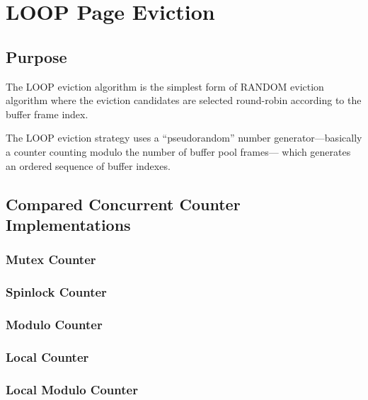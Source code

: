 \chapter[LOOP Page Eviction]{LOOP Page Eviction} \label{ch:loop}

\section[Purpose]{Purpose}

	The LOOP eviction algorithm is the simplest form of RANDOM eviction algorithm where the eviction candidates are selected round-robin according to the buffer frame index.
	
	The LOOP eviction strategy uses a ``pseudorandom'' number generator---basically a counter counting modulo the number of buffer pool frames--- which generates an ordered sequence of buffer indexes.

\section[Compared Concurrent Counter Implementations]{Compared Concurrent Counter Implementations}

\subsection[Mutex Counter]{Mutex Counter} \label{subsec:mutex_counter}

\subsection[Spinlock Counter]{Spinlock Counter} \label{subsec:spinlock_counter}

\subsection[Modulo Counter]{Modulo Counter} \label{subsec:modulo_counter}

\subsection[Local Counter]{Local Counter} \label{subsec:local_counter}

\subsection[Local Modulo Counter]{Local Modulo Counter} \label{subsec:local_modulo_counter}
	

